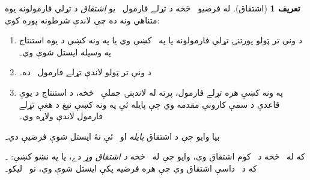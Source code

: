 \documentclass[12pt,a4paper,oneside]{report}
\theoremstyle{definition}
\newtheorem{defn}[thm]{تعريف}
\begin{document}
\label{olpseg:OLP-0088-B007:start}
\begin{defn}[اشتقاق]
 له فرضيو~\LR{$\Gamma$} څخه د تړلے فارمول~ يو \emph{اشتقاق}
د تړلي فارمولونه يوه متناهي ونه ده چې لاندې شرطونه پوره کوي:
\begin{enumerate}
\item د ونې تر ټولو پورتنۍ تړلي فارمولونه يا په~\LR{$\Gamma$} کښې وي يا
  په ونه کښې د يوه استنتاج په وسيله ايستل شوې وي۔
\item د ونې تر ټولو لاندې تړلے فارمول~ ده۔
\item په ونه کښې هره تړلے فارمول، پرته له لاندېنۍ جملې~
  څخه، د استنتاج د يوې قاعدې د سمې کارونې مقدمه وي چې پايله ئې په
  ونه کښې نېغ د هغې تړلے فارمول لاندې ولاړه وي۔
\end{enumerate}
بيا وايو چې  د اشتقاق \emph{پايله} او~\LR{$\Gamma$} ئې
نۀ ايستل شوې فرضيې دي۔
\label{olpseg:OLP-0088-B007:end}

\label{olpseg:OLP-0088-B008:start}
که له~\LR{$\Gamma$} څخه د~ کوم اشتقاق وي، وايو چې 
له~\LR{$\Gamma$} څخه \emph{د اشتقاق وړ} دے، يا په نښو کښې:
۔ که د~ داسې اشتقاق وي چې هره
فرضيه پکې ايستل شوې وي، نو~ ليکو۔
\end{defn}
\label{olpseg:OLP-0088-B008:end}
\end{document}
